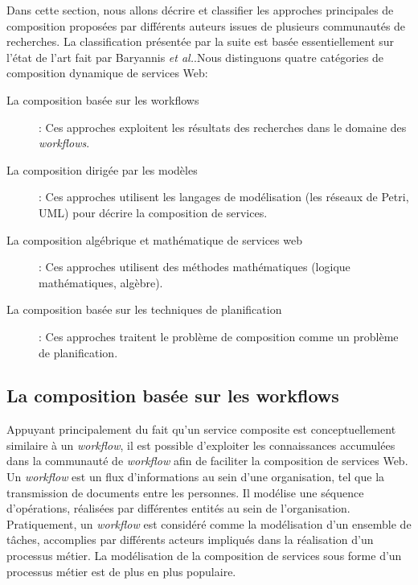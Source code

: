   Dans cette section, nous allons décrire et classifier les approches
  principales de composition proposées par différents auteurs issues
  de plusieurs communautés de recherches. La classification présentée
  par la suite est basée essentiellement sur l'état de l'art fait par
  Baryannis \emph{et al.}\cite{baryannis2010}.Nous distinguons quatre
  catégories de composition dynamique de services Web:

  \renewcommand{\descriptionlabel}[1]{\hspace{0.5cm}\textbullet~\textsf{#1}}
  \begin{description}
  \item[La composition basée sur les workflows]: Ces approches
    exploitent les résultats des recherches dans le domaine des
    \textit{workflows}.

  \item[La composition dirigée par les modèles]: Ces approches
    utilisent les langages de modélisation (les réseaux de Petri,
    \textsc{UML}) pour décrire la composition de services.

  \item[La composition algébrique et mathématique de services web]:
    Ces approches utilisent des méthodes mathématiques (logique
    mathématiques, algèbre).

  \item[La composition basée sur les techniques de planification]: Ces
    approches traitent le problème de composition comme un problème de
    planification.
  \end{description}
  \enddescription

  \subsection{La composition  basée sur les workflows}
  \label{sec:les-approches-basees}
  Appuyant principalement du fait qu'un service composite est
  conceptuellement similaire à un \textit{workflow}, il est possible
  d'exploiter les connaissances accumulées dans la communauté de
  \textit{workflow} afin de faciliter la composition de services
  Web. Un \textit{workflow} est un flux d'informations au sein d'une
  organisation, tel que la transmission de documents entre les
  personnes. Il modélise une séquence d'opérations, réalisées par
  différentes entités au sein de l'organisation. Pratiquement, un
  \textit{workflow} est considéré comme la modélisation d'un ensemble
  de tâches, accomplies par différents acteurs impliqués dans la
  réalisation d'un processus métier. La modélisation de la composition
  de services sous forme d'un processus métier est de plus en plus
  populaire.\medskip

